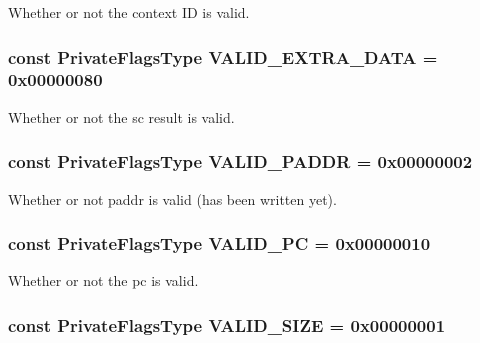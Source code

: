 \label{classRequest_ad48d87929617331987501ce65f540253}
Whether or not the context ID is valid. \hypertarget{classRequest_ad22e050e916b79dee1057c45b2cc3d68}{
\subsubsection[{VALID\_\-EXTRA\_\-DATA}]{\setlength{\rightskip}{0pt plus 5cm}const {\bf PrivateFlagsType} {\bf VALID\_\-EXTRA\_\-DATA} = 0x00000080}}
\label{classRequest_ad22e050e916b79dee1057c45b2cc3d68}
Whether or not the sc result is valid. \hypertarget{classRequest_a5f4f666e62b0ed0b438fe91d80967ee4}{
\subsubsection[{VALID\_\-PADDR}]{\setlength{\rightskip}{0pt plus 5cm}const {\bf PrivateFlagsType} {\bf VALID\_\-PADDR} = 0x00000002}}
\label{classRequest_a5f4f666e62b0ed0b438fe91d80967ee4}
Whether or not paddr is valid (has been written yet). \hypertarget{classRequest_a44bbdf4a07c092e4529a57ad18a64e9c}{
\subsubsection[{VALID\_\-PC}]{\setlength{\rightskip}{0pt plus 5cm}const {\bf PrivateFlagsType} {\bf VALID\_\-PC} = 0x00000010}}
\label{classRequest_a44bbdf4a07c092e4529a57ad18a64e9c}
Whether or not the pc is valid. \hypertarget{classRequest_ab877279328c94a99e08df0bef2dff5af}{
\subsubsection[{VALID\_\-SIZE}]{\setlength{\rightskip}{0pt plus 5cm}const {\bf PrivateFlagsType} {\bf VALID\_\-SIZE} = 0x00000001}}

